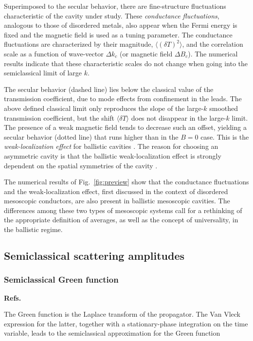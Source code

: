 \documentclass[a4paper,10pt]{article}
\newcommand{\nin}{\noindent}
\newcommand{\dlT}{\delta T}
\begin{document}
\nin Superimposed to the secular behavior, there are fine-structure
fluctuations characteristic of the cavity under study. These
{\it conductance fluctuations}, analogous to those of disordered
metals, also appear when the Fermi energy is fixed and the
magnetic field is used as a tuning parameter. The conductance
fluctuations are characterized by their magnitude, $\langle(\dlT)^2\rangle$, and the correlation scale as a function of 
wave-vector $\Delta k_c$ (or magnetic field $\Delta B_c$). The numerical results indicate that these characteristic scales do not change when going into the semiclassical limit of large $k$. 

\nin The secular behavior (dashed line) lies below the classical value
of the transmission coefficient, due to mode effects from confinement 
in the leads. The above defined classical limit only reproduces
the slope of the large-$k$ smoothed transmission coefficient, but
the shift $\langle \delta T \rangle$ does not disappear in the large-$k$ limit. The presence of a weak magnetic field tends to decrease such an offset, yielding a secular behavior (dotted line) that runs higher than in the $B\!=\!0$ case. This is the {\it weak-localization effect} for 
ballistic cavities \cite{Bar93}. The reason for choosing an asymmetric cavity is that the ballistic weak-localization effect is strongly dependent on the spatial symmetries of the cavity \cite{BaMe96}.

\nin The numerical results of Fig.~\ref{fig:preview} show that the conductance fluctuations and the weak-localization effect, first discussed in the context of disordered mesoscopic conductors, are also present
in ballistic mesoscopic cavities. The differences among these two types of mesoscopic systems call for a rethinking of the appropriate definition of averages, as well as the concept of universality, in the ballistic regime. 

\subsection{Semiclassical scattering amplitudes}
\label{subsec:sta}

\subsubsection{Semiclassical Green function}

{\bf Refs.~\cite{Ozor-88,gutz_ra,gutz_book,brack_book,Stoe_99,Haak_01}}

\nin The Green function is the Laplace transform of the propagator. The Van Vleck expression for the latter, together with a stationary-phase
integration on the time variable, leads to the semiclassical 
approximation for the Green function
\end{document}
